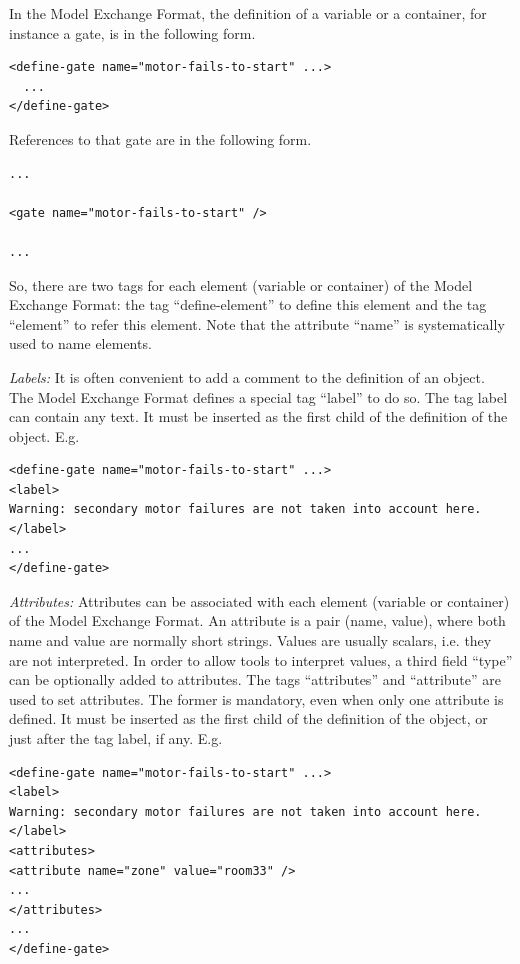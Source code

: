 \documentclass[11pt]{article}
\begin{document}
In the Model Exchange Format, the definition of a variable or a
container, for instance a gate, is in the following form.

\lstset{language=XML,label= ,caption= ,captionpos=b,numbers=none}
\begin{lstlisting}
<define-gate name="motor-fails-to-start" ...>
  ...
</define-gate>
\end{lstlisting}

References to that gate are in the following form.


\lstset{language=XML,label= ,caption= ,captionpos=b,numbers=none}
\begin{lstlisting}
...

<gate name="motor-fails-to-start" />

...
\end{lstlisting}

So, there are two tags for each element (variable or container) of the
Model Exchange Format: the tag ``define-element'' to define this element
and the tag ``element'' to refer this element. Note that the attribute
``name'' is systematically used to name elements.

\emph{Labels:} It is often convenient to add a comment to the definition of
an object. The Model Exchange Format defines a special tag ``label'' to do
so. The tag label can contain any text. It must be inserted as the first
child of the definition of the object. E.g.

\lstset{language=XML,label= ,caption= ,captionpos=b,numbers=none}
\begin{lstlisting}
<define-gate name="motor-fails-to-start" ...>
<label>
Warning: secondary motor failures are not taken into account here.
</label>
...
</define-gate>
\end{lstlisting}

\emph{Attributes:} Attributes can be associated with each element (variable
or container) of the Model Exchange Format. An attribute is a pair
(name, value), where both name and value are normally short strings.
Values are usually scalars, i.e. they are not interpreted. In order to
allow tools to interpret values, a third field ``type'' can be optionally
added to attributes. The tags ``attributes'' and ``attribute'' are used to
set attributes. The former is mandatory, even when only one attribute is
defined. It must be inserted as the first child of the definition of the
object, or just after the tag label, if any. E.g.
\lstset{language=XML,label= ,caption= ,captionpos=b,numbers=none}
\begin{lstlisting}
<define-gate name="motor-fails-to-start" ...>
<label>
Warning: secondary motor failures are not taken into account here.
</label>
<attributes>
<attribute name="zone" value="room33" />
...
</attributes>
...
</define-gate>
\end{lstlisting}
\end{document}
